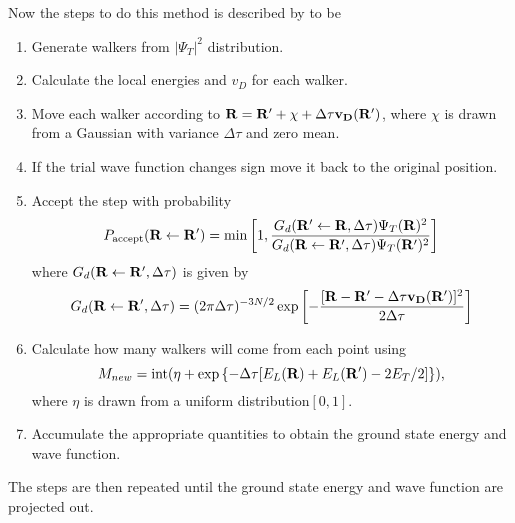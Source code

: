 Now the steps to do this method is described by \cite{foulkes2001} to be
\begin{enumerate}
  \item{Generate walkers from $\left| \Psi_T \right|^2$ distribution.}
  \item{Calculate the local energies and $v_D$ for each walker.}
  \item{Move each walker according to $\mathbf{R} = \mathbf{R}' + \chi + \Delta\tau \mathbf{v_D}(\mathbf{R}')$, where $\chi$ is drawn from a Gaussian with variance $\Delta\tau$ and zero mean.}
  \item{If the trial wave function changes sign move it back to the original position.}
  \item{Accept the step with probability
    \begin{equation}
      P_{\mathrm{accept}}(\mathbf{R} \leftarrow \mathbf{R}') = \mathrm{min}\left[ 1, \frac{G_d(\mathbf{R}' \leftarrow \mathbf{R}, \Delta\tau) \Psi_T(\mathbf{R})^2}{G_d(\mathbf{R} \leftarrow \mathbf{R}', \Delta\tau) \Psi_T(\mathbf{R}')^2} \right]
    \end{equation}
    where $G_d(\mathbf{R} \leftarrow \mathbf{R}', \Delta\tau)$ is given by
    \begin{equation}
      G_d(\mathbf{R} \leftarrow \mathbf{R}', \Delta\tau) = (2\pi\Delta\tau)^{-3N/2} \exp{\left[ -\frac{[\mathbf{R}-\mathbf{R}'-\Delta\tau\mathbf{v_D}(\mathbf{R}')]^2}{2\Delta\tau} \right]}
    \end{equation}
  }
  \item{Calculate how many walkers will come from each point using
    \begin{equation}
      M_{new} = \mathrm{int}(\eta+\exp\left\{-\Delta\tau[E_L(\mathbf{R})+E_L(\mathbf{R}')-2E_T/2]\right\}),
    \end{equation}
    where $\eta$ is drawn from a uniform distribution$[0,1]$.
  }
  \item{Accumulate the appropriate quantities to obtain the ground state energy and wave function.}
\end{enumerate}
The steps are then repeated until the ground state energy and wave function are projected out.
